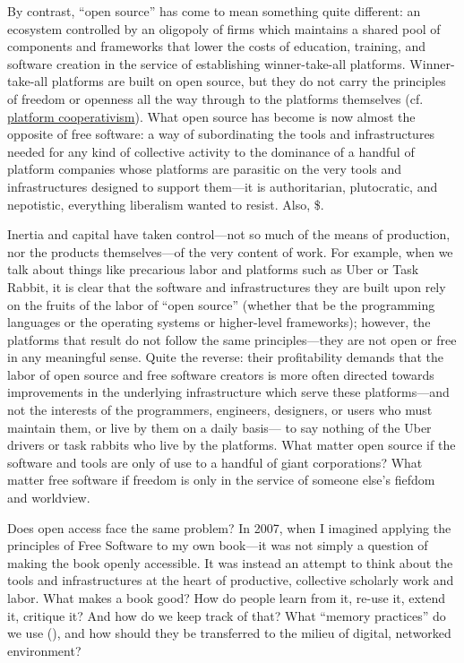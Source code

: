 \documentclass[11pt]{article}
\begin{document}
By contrast, ``open source'' has come to mean something quite different: an ecosystem controlled by an oligopoly of firms which maintains a shared pool of components and frameworks that lower the costs of education, training, and software creation in the service of establishing winner-take-all platforms.  Winner-take-all platforms are built on open source, but they do not carry the principles of freedom or openness all the way through to the platforms themselves (cf. \href{https://platform.coop/directory}{platform cooperativism}).  What open source has become is now almost the opposite of free software:  a way of subordinating the tools and infrastructures needed for any kind of collective activity to the dominance of a handful of platform companies whose platforms are parasitic on the very tools and infrastructures designed to support them---it is authoritarian, plutocratic, and nepotistic, everything liberalism wanted to resist. Also, \$. 

Inertia and capital have taken control---not so much of the means of production, nor the products themselves---of the very content of work.   For example, when we talk about things like precarious labor and platforms such as Uber or Task Rabbit, it is clear that the software and infrastructures they are built upon rely on the fruits of the labor of ``open source'' (whether that be the programming languages or the operating systems or higher-level frameworks); however, the platforms that result do not follow the same principles---they are not open or free in any meaningful sense.  Quite the reverse: their profitability demands that the labor of open source and free software creators is more often directed towards improvements in the underlying infrastructure which serve these platforms---and not the interests of the programmers, engineers, designers, or users who must maintain them, or live by them on a daily basis--- to say nothing of the Uber drivers or task rabbits who live by the platforms.  What  matter open source if the software and tools are only of use to a handful of giant corporations?  What matter free software if freedom is only in the service of someone else's fiefdom and worldview. 

Does open access face the same problem?  In 2007, when I imagined applying the principles of Free Software to my own book---it was not simply a question of making the book openly accessible.  It was instead an attempt to think about the tools and infrastructures at the heart of productive, collective scholarly work and labor.  What makes a book good? How do people learn from it, re-use it, extend it, critique it?  And how do we keep track of that? What ``memory practices'' do we use (\cite{bowker2005memorpracscien}), and how should they be transferred to the milieu of digital, networked environment?
\end{document}
